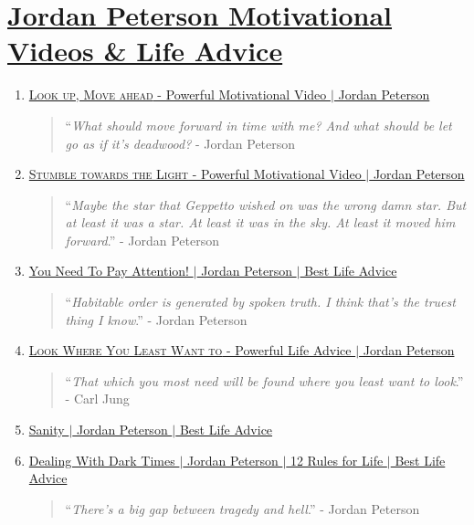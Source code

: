 \documentclass{book}
\numberwithin{equation}{section}
\begin{document}
\section{\href{https://www.youtube.com/playlist?list=PLi3n6z1voQ1arCpQ89izFMwk7lsFrFnq0}{Jordan Peterson Motivational Videos \& Life Advice}}
\begin{enumerate}
    \item \href{https://www.youtube.com/watch?v=MUmKnW1j2Xs}{\textsc{Look up, Move ahead} - Powerful Motivational Video $|$ Jordan Peterson}    
    \begin{quotation}
        ``\textit{What should move forward in time with me? And what should be let go as if it's deadwood?} - Jordan Peterson
    \end{quotation}
    \item \href{https://www.youtube.com/watch?v=PrIrZRd0pGE}{\textsc{Stumble towards the Light} - Powerful Motivational Video $|$ Jordan Peterson}    
    \begin{quotation}
        ``\textit{Maybe the star that Geppetto wished on was the wrong damn star. But at least it was a star. At least it was in the sky. At least it moved him forward}.'' - Jordan Peterson
    \end{quotation}
    \item \href{https://www.youtube.com/watch?v=L0FCwYKkZ4o}{You Need To Pay Attention! $|$ Jordan Peterson $|$ Best Life Advice}    
    \begin{quotation}
        ``\textit{Habitable order is generated by spoken truth. I think that's the truest thing I know}.'' - Jordan Peterson
    \end{quotation}
    \item \href{https://www.youtube.com/watch?v=LjIAzKo62MQ}{\textsc{Look Where You Least Want to} - Powerful Life Advice $|$ Jordan Peterson}    
    \begin{quotation}
        ``\textit{That which you most need will be found where you least want to look}.'' - Carl Jung
    \end{quotation}
    \item \href{https://www.youtube.com/watch?v=_g6Aqrl3fFM}{Sanity $|$ Jordan Peterson $|$ Best Life Advice}
    \item \href{https://www.youtube.com/watch?v=3EGIlQyEwvE}{Dealing With Dark Times $|$ Jordan Peterson $|$ 12 Rules for Life $|$ Best Life Advice}    
    \begin{quotation}
        ``\textit{There's a big gap between tragedy and hell}.'' - Jordan Peterson

\end{quotation}
\end{enumerate}
\end{document}
